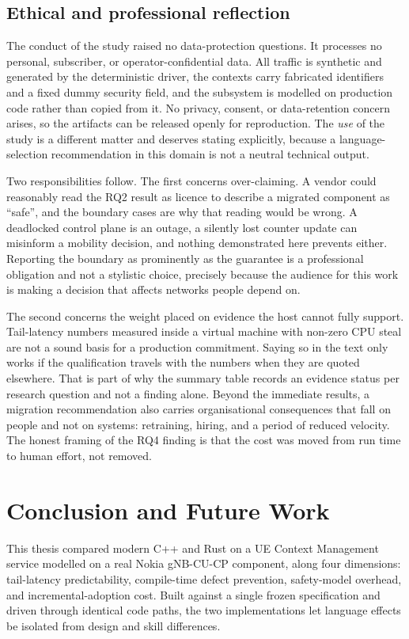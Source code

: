 \documentclass[english,oneside,a4paper,censored,csm,software-track-2020]{HYthesisML}
\begin{document}
\section{Ethical and professional reflection}
The conduct of the study raised no data-protection questions. It processes no personal,
subscriber, or operator-confidential data. All traffic is synthetic and generated by the
deterministic driver, the contexts carry fabricated identifiers and a fixed dummy security
field, and the subsystem is modelled on production code rather than copied from it. No privacy,
consent, or data-retention concern arises, so the artifacts can be released openly for
reproduction. The \emph{use} of the study is a different matter and deserves stating explicitly,
because a language-selection recommendation in this domain is not a neutral technical output.

Two responsibilities follow. The first concerns over-claiming. A vendor could reasonably read
the RQ2 result as licence to describe a migrated component as ``safe'', and the boundary cases
are why that reading would be wrong. A deadlocked control plane is an outage, a
silently lost counter update can misinform a mobility decision, and nothing demonstrated here
prevents either. Reporting the boundary as prominently as the guarantee is a
professional obligation and not a stylistic choice, precisely because the audience for this work
is making a decision that affects networks people depend on.

The second concerns the weight
placed on evidence the host cannot fully support. Tail-latency numbers measured inside a virtual
machine with non-zero CPU steal are not a sound basis for a production commitment. Saying so
in the text only works if the qualification travels with the numbers when they are quoted
elsewhere. That is part
of why the summary table records an evidence status per research question and not a
finding alone. Beyond the immediate results, a migration recommendation also carries
organisational consequences that fall on people and not on systems: retraining, hiring, and a
period of reduced velocity. The honest framing of the RQ4 finding is that the cost
was moved from run time to human effort, not removed.

\chapter{Conclusion and Future Work\label{chapter:conclusions}}

This thesis compared modern C++ and Rust on a UE Context Management service modelled on a real
Nokia gNB-CU-CP component, along four dimensions: tail-latency predictability, compile-time
defect prevention, safety-model overhead, and incremental-adoption cost. Built against a single
frozen specification and driven through identical code paths, the two implementations let
language effects be isolated from design and skill differences.
\end{document}
